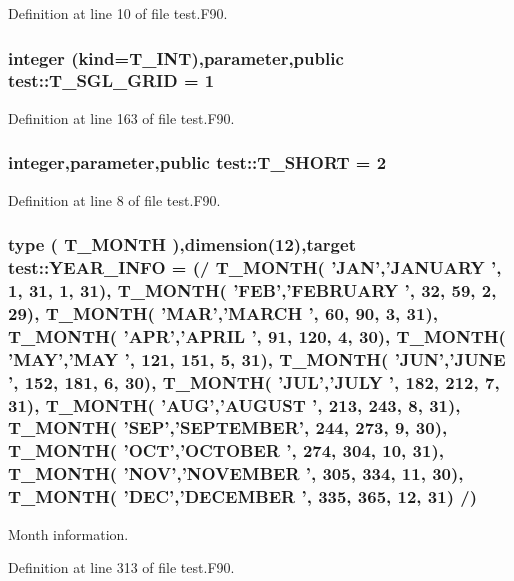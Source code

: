 Definition at line 10 of file test.F90.

\hypertarget{namespacetest_a60ae6ddfc7d411862eddaea30f59049f}{
\subsubsection[{T\_\-SGL\_\-GRID}]{\setlength{\rightskip}{0pt plus 5cm}integer (kind={\bf T\_\-INT}),parameter,public {\bf test::T\_\-SGL\_\-GRID} = 1}}
\label{namespacetest_a60ae6ddfc7d411862eddaea30f59049f}


Definition at line 163 of file test.F90.

\hypertarget{namespacetest_a78d9db20f77ee4f9cf3ac5abfb7062b9}{
\subsubsection[{T\_\-SHORT}]{\setlength{\rightskip}{0pt plus 5cm}integer,parameter,public {\bf test::T\_\-SHORT} = 2}}
\label{namespacetest_a78d9db20f77ee4f9cf3ac5abfb7062b9}


Definition at line 8 of file test.F90.

\hypertarget{namespacetest_a0cc123ab400cd2007652453350776116}{
\subsubsection[{YEAR\_\-INFO}]{\setlength{\rightskip}{0pt plus 5cm}type ( {\bf T\_\-MONTH} ),dimension(12),target {\bf test::YEAR\_\-INFO} = (/ {\bf T\_\-MONTH}( 'JAN','JANUARY ', 1, 31, 1, 31), {\bf T\_\-MONTH}( 'FEB','FEBRUARY ', 32, 59, 2, 29), {\bf T\_\-MONTH}( 'MAR','MARCH ', 60, 90, 3, 31), {\bf T\_\-MONTH}( 'APR','APRIL ', 91, 120, 4, 30), {\bf T\_\-MONTH}( 'MAY','MAY ', 121, 151, 5, 31), {\bf T\_\-MONTH}( 'JUN','JUNE ', 152, 181, 6, 30), {\bf T\_\-MONTH}( 'JUL','JULY ', 182, 212, 7, 31), {\bf T\_\-MONTH}( 'AUG','AUGUST ', 213, 243, 8, 31), {\bf T\_\-MONTH}( 'SEP','SEPTEMBER', 244, 273, 9, 30), {\bf T\_\-MONTH}( 'OCT','OCTOBER ', 274, 304, 10, 31), {\bf T\_\-MONTH}( 'NOV','NOVEMBER ', 305, 334, 11, 30), {\bf T\_\-MONTH}( 'DEC','DECEMBER ', 335, 365, 12, 31) /)}}
\label{namespacetest_a0cc123ab400cd2007652453350776116}


Month information. 



Definition at line 313 of file test.F90.

